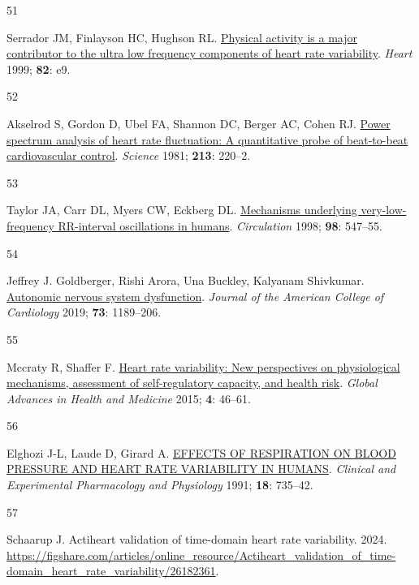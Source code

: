 \documentclass[
  a4paper,
  headsepline=true,
  open=any]{scrbook}
\newlength{\cslhangindent}
\newlength{\csllabelwidth}
\newlength{\cslentryspacingunit} %
\newenvironment{CSLReferences}[2] %
 {%
  \setlength{\parindent}{0pt}
  \ifodd #1
  \let\oldpar\par
  \def\par{\hangindent=\cslhangindent\oldpar}
  \fi
  \setlength{\parskip}{#2\cslentryspacingunit}
 }%
 {}
\newcommand{\CSLLeftMargin}[1]{\parbox[t]{\csllabelwidth}{#1}}
\newcommand{\CSLRightInline}[1]{\parbox[t]{\linewidth - \csllabelwidth}{#1}\break}
\begin{document}
\begin{CSLReferences}{0}{0}
\leavevmode{}%
\CSLLeftMargin{51 }%
\CSLRightInline{Serrador JM, Finlayson HC, Hughson RL.
\href{https://doi.org/10.1136/hrt.82.6.e9}{Physical activity is a major
contributor to the ultra low frequency components of heart rate
variability}. \emph{Heart} 1999; \textbf{82}: e9.}

\leavevmode{}%
\CSLLeftMargin{52 }%
\CSLRightInline{Akselrod S, Gordon D, Ubel FA, Shannon DC, Berger AC,
Cohen RJ. \href{https://doi.org/10.1126/science.6166045}{Power spectrum
analysis of heart rate fluctuation: A quantitative probe of beat-to-beat
cardiovascular control}. \emph{Science} 1981; \textbf{213}: 220--2.}

\leavevmode{}%
\CSLLeftMargin{53 }%
\CSLRightInline{Taylor JA, Carr DL, Myers CW, Eckberg DL.
\href{https://doi.org/10.1161/01.CIR.98.6.547}{Mechanisms underlying
very-low-frequency RR-interval oscillations in humans}.
\emph{Circulation} 1998; \textbf{98}: 547--55.}

\leavevmode{}%
\CSLLeftMargin{54 }%
\CSLRightInline{Jeffrey J. Goldberger, Rishi Arora, Una Buckley,
Kalyanam Shivkumar.
\href{https://doi.org/doi:10.1016/j.jacc.2018.12.064}{Autonomic nervous
system dysfunction}. \emph{Journal of the American College of
Cardiology} 2019; \textbf{73}: 1189--206.}

\leavevmode{}%
\CSLLeftMargin{55 }%
\CSLRightInline{Mccraty R, Shaffer F.
\href{https://doi.org/10.7453/gahmj.2014.073}{Heart rate variability:
New perspectives on physiological mechanisms, assessment of
self-regulatory capacity, and health risk}. \emph{Global Advances in
Health and Medicine} 2015; \textbf{4}: 46--61.}

\leavevmode{}%
\CSLLeftMargin{56 }%
\CSLRightInline{Elghozi J-L, Laude D, Girard A.
\href{https://doi.org/10.1111/j.1440-1681.1991.tb01391.x}{EFFECTS OF
RESPIRATION ON BLOOD PRESSURE AND HEART RATE VARIABILITY IN HUMANS}.
\emph{Clinical and Experimental Pharmacology and Physiology} 1991;
\textbf{18}: 735--42.}

\leavevmode{}%
\CSLLeftMargin{57 }%
\CSLRightInline{Schaarup J. Actiheart validation of time-domain heart
rate variability. 2024.
\url{https://figshare.com/articles/online_resource/Actiheart_validation_of_time-domain_heart_rate_variability/26182361}.}


\end{CSLReferences}
\end{document}
